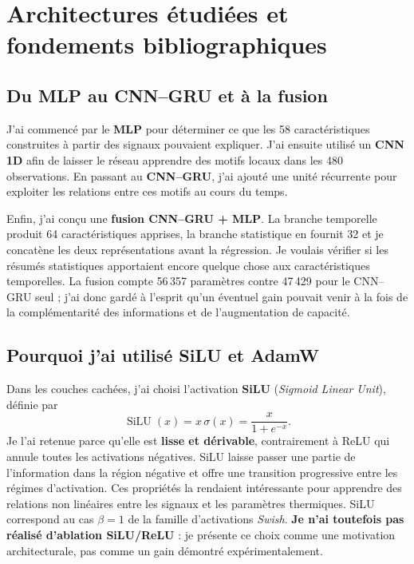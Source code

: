 \documentclass[10pt,a4paper]{article}
\begin{document}
\section{Architectures étudiées et fondements bibliographiques}

\subsection{Du MLP au CNN--GRU et à la fusion}
J'ai commencé par le \textbf{MLP} pour déterminer ce que les 58 caractéristiques construites à partir des signaux pouvaient expliquer. J'ai ensuite utilisé un \textbf{CNN 1D} afin de laisser le réseau apprendre des motifs locaux dans les 480 observations. En passant au \textbf{CNN--GRU}, j'ai ajouté une unité récurrente pour exploiter les relations entre ces motifs au cours du temps.

Enfin, j'ai conçu une \textbf{fusion CNN--GRU + MLP}. La branche temporelle produit 64 caractéristiques apprises, la branche statistique en fournit 32 et je concatène les deux représentations avant la régression. Je voulais vérifier si les résumés statistiques apportaient encore quelque chose aux caractéristiques temporelles. La fusion compte 56\,357 paramètres contre 47\,429 pour le CNN--GRU seul ; j'ai donc gardé à l'esprit qu'un éventuel gain pouvait venir à la fois de la complémentarité des informations et de l'augmentation de capacité.

\subsection{Pourquoi j'ai utilisé SiLU et AdamW}
Dans les couches cachées, j'ai choisi l'activation \textbf{SiLU} (\emph{Sigmoid Linear Unit}), définie par
\begin{equation}
\operatorname{SiLU}(x)=x\,\sigma(x)=\frac{x}{1+e^{-x}}.
\end{equation}
Je l'ai retenue parce qu'elle est \textbf{lisse et dérivable}, contrairement à ReLU qui annule toutes les activations négatives. SiLU laisse passer une partie de l'information dans la région négative et offre une transition progressive entre les régimes d'activation. Ces propriétés la rendaient intéressante pour apprendre des relations non linéaires entre les signaux et les paramètres thermiques. SiLU correspond au cas $\beta=1$ de la famille d'activations \emph{Swish}. \textbf{Je n'ai toutefois pas réalisé d'ablation SiLU/ReLU} : je présente ce choix comme une motivation architecturale, pas comme un gain démontré expérimentalement.
\end{document}
